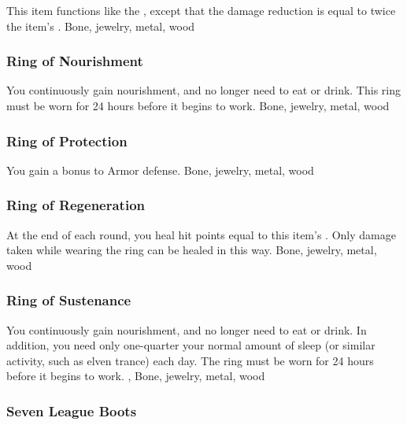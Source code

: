 This item functions like the , except that the damage reduction is equal to twice the item's .
 
 Bone, jewelry, metal, wood
\lowercase{\hypertarget{item:Ring of Nourishment}{}}\label{item:Ring of Nourishment}
\hypertarget{item:Ring of Nourishment}{\subsubsection{Ring of Nourishment\hfill{}}}
You continuously gain nourishment, and no longer need to eat or drink.
This ring must be worn for 24 hours before it begins to work.
 
 Bone, jewelry, metal, wood
\lowercase{\hypertarget{item:Ring of Protection}{}}\label{item:Ring of Protection}
\hypertarget{item:Ring of Protection}{\subsubsection{Ring of Protection\hfill{}}}
You gain a  bonus to Armor defense.
 
 Bone, jewelry, metal, wood
\lowercase{\hypertarget{item:Ring of Regeneration}{}}\label{item:Ring of Regeneration}
\hypertarget{item:Ring of Regeneration}{\subsubsection{Ring of Regeneration\hfill{}}}
At the end of each round, you heal hit points equal to this item's .
Only damage taken while wearing the ring can be healed in this way.
 
 Bone, jewelry, metal, wood
\lowercase{\hypertarget{item:Ring of Sustenance}{}}\label{item:Ring of Sustenance}
\hypertarget{item:Ring of Sustenance}{\subsubsection{Ring of Sustenance\hfill{}}}
You continuously gain nourishment, and no longer need to eat or drink.
In addition, you need only one-quarter your normal amount of sleep (or similar activity, such as elven trance) each day.
The ring must be worn for 24 hours before it begins to work.
 , 
 Bone, jewelry, metal, wood
\lowercase{\hypertarget{item:Seven League Boots}{}}\label{item:Seven League Boots}
\hypertarget{item:Seven League Boots}{\subsubsection{Seven League Boots\hfill{}}}
